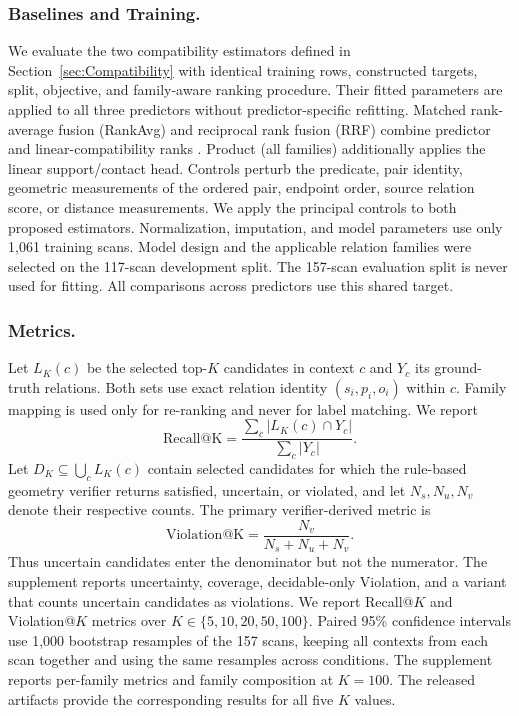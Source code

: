 \subsubsection{Baselines and Training.}
We evaluate the two compatibility estimators defined in Section~\ref{sec:Compatibility} with identical training rows, constructed targets, split, objective, and family-aware ranking procedure. Their fitted parameters are applied to all three predictors without predictor-specific refitting. Matched rank-average fusion (RankAvg) and reciprocal rank fusion (RRF) combine predictor and linear-compatibility ranks \cite{10.1145/1571941.1572114}. Product (all families) additionally applies the linear support/contact head. Controls perturb the predicate, pair identity, geometric measurements of the ordered pair, endpoint order, source relation score, or distance measurements. We apply the principal controls to both proposed estimators.
Normalization, imputation, and model parameters use only 1,061 training scans. Model design and the applicable relation families were selected on the 117-scan development split. The 157-scan evaluation split is never used for fitting. All comparisons across predictors use this shared target.

\subsubsection{Metrics.}
Let $L_K(c)$ be the selected top-$K$ candidates in context $c$ and $Y_c$ its ground-truth relations. Both sets use exact relation identity $(s_i,p_i,o_i)$ within $c$. Family mapping is used only for re-ranking and never for label matching. We report
\begin{equation}
\mathrm{Recall@K}=\frac{\sum_c |L_K(c)\cap Y_c|}{\sum_c |Y_c|}.
\end{equation}
Let $D_K\subseteq\bigcup_c L_K(c)$ contain selected candidates for which the rule-based geometry verifier returns satisfied, uncertain, or violated, and let $N_s,N_u,N_v$ denote their respective counts. The primary verifier-derived metric is
\begin{equation}
\mathrm{Violation@K}=\frac{N_v}{N_s+N_u+N_v}.
\end{equation}
Thus uncertain candidates enter the denominator but not the numerator. 
The supplement reports uncertainty, coverage, decidable-only Violation, and a variant that counts uncertain candidates as violations.
We report Recall@$K$ and Violation@$K$ metrics over $K \in \{5, 10, 20, 50, 100\}$. Paired 95\% confidence intervals use 1,000 bootstrap resamples of the 157 scans, keeping all contexts from each scan together and using the same resamples across conditions. The supplement reports per-family metrics and family composition at $K=100$. The released artifacts provide the corresponding results for all five $K$ values.

